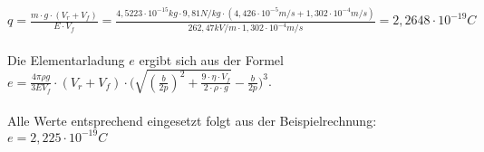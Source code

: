 $q=\frac{m\cdot g \cdot (V_r + V_f)}{E \cdot V_f}=\frac{4,5223 \cdot 10^{-15}kg \cdot 9,81N/kg\cdot (4,426\cdot 10^{-5}m/s + 1,302\cdot 10^{-4}m/s)}{262,47kV/m \cdot 1,302\cdot 10^{-4}m/s}=2,2648 \cdot 10^{-19}C$
\\ \\
Die Elementarladung $e$ ergibt sich aus der Formel \\
 $e = \frac{4 \pi \rho g}{3 E V_f}\cdot (V_r + V_f)\cdot \Biggl( \sqrt{(\frac{b}{2p})^2 + \frac{9\cdot \eta \cdot V_f}{2\cdot \rho \cdot g} } -\frac{b}{2p} \Biggr)^3$. 
\\ \\
Alle Werte entsprechend eingesetzt folgt aus der Beispielrechnung: 
\\
$e = 2,225\cdot 10^{-19}C$